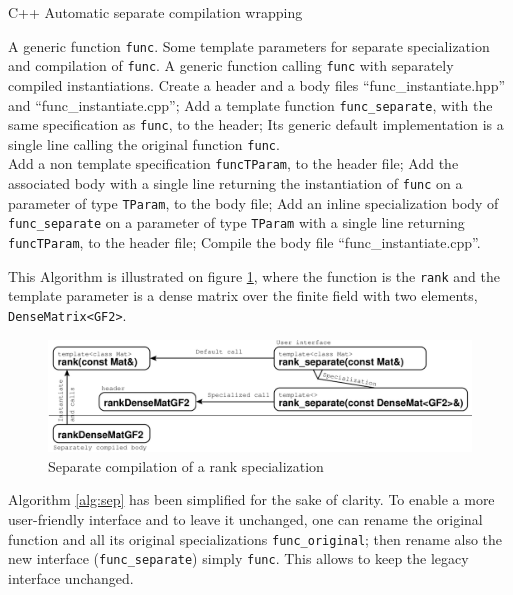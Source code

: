 \documentclass[runningheads,a4paper]{llncs}
\begin{document}
\begin{algorithm}[ht]
\caption{C++ Automatic separate compilation wrapping}\label{alg:sep}
\begin{algorithmic}[1]
\REQUIRE A generic function \texttt{func}.
\REQUIRE Some template parameters for separate specialization and
compilation of  \texttt{func}.
\ENSURE A generic function calling
\texttt{func} with separately compiled instantiations.
\STATE Create a header and a body files ``func\_instantiate.hpp'' and ``func\_instantiate.cpp'';
\STATE Add a template function \texttt{func\_separate}, with the same
specification as \texttt{func}, to the header;
\STATE Its generic default implementation is a single line calling the
original function \texttt{func}.\\ 
  \STATE Add  a non template specification
  \texttt{funcTParam}, to the header file;
  \STATE Add the associated body with a
  single line returning the instantiation of
  \texttt{func} on a parameter of type \texttt{TParam}, to the body file;
  \STATE Add an inline specialization
  body of \texttt{func\_separate} on a parameter of type
  \texttt{TParam} with a single line returning \texttt{funcTParam}, to
  the header file; 
\ENDFOR
\STATE Compile the body file ``func\_instantiate.cpp''.
\end{algorithmic}
\end{algorithm}

This Algorithm is illustrated on figure \ref{fig:sep}, where
the function is the \texttt{rank} and the template parameter is a dense
matrix over the finite field with two elements,
\texttt{DenseMatrix<GF2>}.
\begin{figure}[ht]
\includegraphics[width=\textwidth]{separate}
\caption{Separate compilation of a rank specialization}\label{fig:sep}
\end{figure}

%
\begin{remark} Algorithm \ref{alg:sep} has been simplified for the
  sake of clarity. To enable a more user-friendly interface and to
  leave it unchanged, one can rename the original function and all its
  original specializations \texttt{func\_original}; then rename also
  the new interface (\texttt{func\_separate}) simply
  \texttt{func}. This allows to keep the legacy
  interface unchanged. 
\end{remark}
\end{document}
